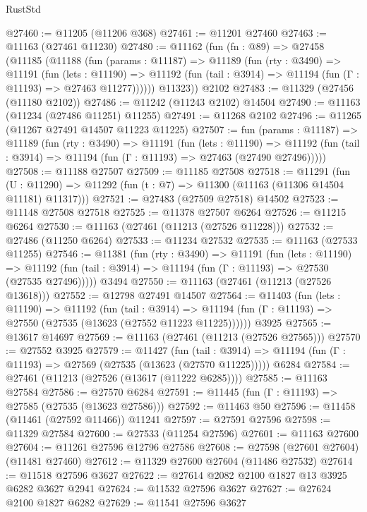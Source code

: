 \begin{lexlean}{RustStd}
\begin{coremodule}
@27460 := @11205 (@11206 @368)
@27461 := @11201 @27460
@27463 := @11163 (@27461 @11230)
@27480 := @11162
    (fun (fn : @89) =>
    @27458
      (@11185
        (@11188
          (fun (params : @11187) =>
          @11189
            (fun (rty : @3490) =>
            @11191
              (fun (lets : @11190) =>
              @11192 (fun (tail : @3914) => @11194 (fun (Γ : @11193) => @27463 @11277))))))
        @11323))
    @2102
@27483 := @11329 (@27456 (@11180 @2102))
@27486 := @11242 (@11243 @2102) @14504
@27490 := @11163 (@11234 (@27486 @11251) @11255)
@27491 := @11268 @2102
@27496 := @11265 (@11267 @27491 @14507 @11223 @11225)
@27507 := fun (params : @11187) =>
  @11189
    (fun (rty : @3490) =>
    @11191
      (fun (lets : @11190) =>
      @11192 (fun (tail : @3914) => @11194 (fun (Γ : @11193) => @27463 (@27490 @27496)))))
@27508 := @11188 @27507
@27509 := @11185 @27508
@27518 := @11291
    (fun (U : @11290) => @11292 (fun (t : @7) => @11300 (@11163 (@11306 @14504 @11181) @11317)))
@27521 := @27483 (@27509 @27518) @14502
@27523 := @11148 @27508 @27518
@27525 := @11378 @27507 @6264
@27526 := @11215 @6264
@27530 := @11163 (@27461 (@11213 (@27526 @11228)))
@27532 := @27486 (@11250 @6264)
@27533 := @11234 @27532
@27535 := @11163 (@27533 @11255)
@27546 := @11381
    (fun (rty : @3490) =>
    @11191
      (fun (lets : @11190) =>
      @11192 (fun (tail : @3914) => @11194 (fun (Γ : @11193) => @27530 (@27535 @27496)))))
    @3494
@27550 := @11163 (@27461 (@11213 (@27526 @13618)))
@27552 := @12798 @27491 @14507
@27564 := @11403
    (fun (lets : @11190) =>
    @11192
      (fun (tail : @3914) =>
      @11194 (fun (Γ : @11193) => @27550 (@27535 (@13623 (@27552 @11223 @11225))))))
    @3925
@27565 := @13617 @14697
@27569 := @11163 (@27461 (@11213 (@27526 @27565)))
@27570 := @27552 @3925
@27579 := @11427
    (fun (tail : @3914) => @11194 (fun (Γ : @11193) => @27569 (@27535 (@13623 (@27570 @11225)))))
    @6284
@27584 := @27461 (@11213 (@27526 (@13617 (@11222 @6285))))
@27585 := @11163 @27584
@27586 := @27570 @6284
@27591 := @11445 (fun (Γ : @11193) => @27585 (@27535 (@13623 @27586)))
@27592 := @11463 @50
@27596 := @11458 (@11461 (@27592 @11466)) @11241
@27597 := @27591 @27596
@27598 := @11329 @27584
@27600 := @27533 (@11254 @27596)
@27601 := @11163 @27600
@27604 := @11261 @27596 @12796 @27586
@27608 := @27598 (@27601 @27604) (@11481 @27460)
@27612 := @11329 @27600 @27604 (@11486 @27532)
@27614 := @11518 @27596 @3627
@27622 := @27614 @2082 @2100 @1827 @13 @3925 @6282 @3627 @2941
@27624 := @11532 @27596 @3627
@27627 := @27624 @2100 @1827 @6282
@27629 := @11541 @27596 @3627

\end{coremodule}
\end{lexlean}
